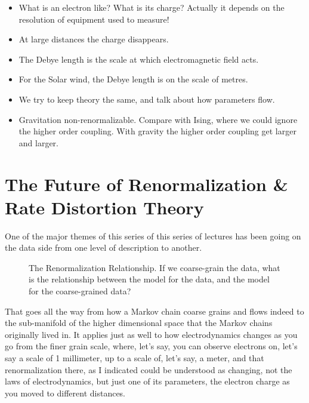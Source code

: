 \documentclass[]{article}
\begin{document}
\begin{itemize}
	\item What is an electron like? What is its charge? Actually it depends on the resolution of equipment used to measure! 
	\item At large distances the charge disappears. 
	\item The Debye length is the scale at which electromagnetic field acts.
	\item For the Solar wind, the Debye length is on the scale of metres.
	\item We try to keep theory the same, and talk about how parameters flow.
	\item Gravitation non-renormalizable. Compare with Ising, where we could ignore the higher order coupling. With gravity the higher order coupling get larger and larger.
\end{itemize}

\section{The Future of Renormalization \& Rate Distortion Theory}



One of the major themes of this series of this series of lectures has been going on the data side from one level of description to another.

\begin{figure}[H]
	\begin{center}
		\caption[The Renormalization Relationship]{The Renormalization Relationship. If we coarse-grain the data, what is the relationship between the model for the data, and the model for the coarse-grained data?}\label{fig:renormalization-relationship}
	\end{center}
\end{figure}

That goes all the way from how a Markov chain coarse grains and flows indeed to the sub-manifold of the higher dimensional space that the Markov chains originally lived in. It applies just as well to how electrodynamics changes as you go from the finer grain scale, where, let's say, you can observe electrons on, let's say a scale of 1 millimeter, up to a scale of, let's say, a meter, and that renormalization there, as I indicated could be understood as changing, not the laws of electrodynamics, but just one of its parameters, the electron charge as you moved to different distances. 
\end{document}
